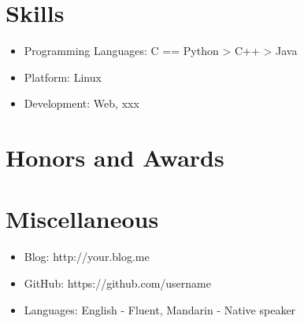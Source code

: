 \documentclass{article}
\begin{document}
\section{Skills}
\begin{itemize}[parsep=0.5ex]
  \item Programming Languages: C == Python > C++ > Java
  \item Platform: Linux
  \item Development: Web, xxx
\end{itemize}

\section{Honors and Awards}

\section{Miscellaneous}
\begin{itemize}[parsep=0.5ex]
  \item Blog: http://your.blog.me
  \item GitHub: https://github.com/username
  \item Languages: English - Fluent, Mandarin - Native speaker
\end{itemize}

%
%
\end{document}
